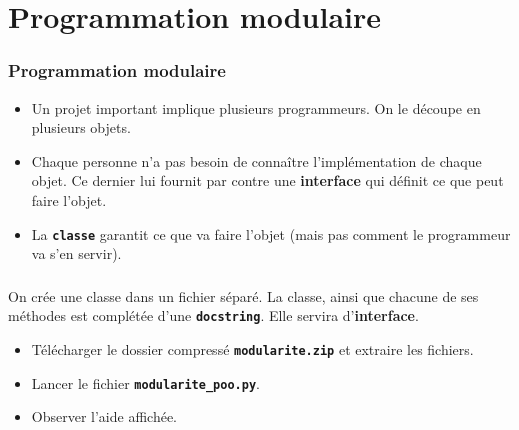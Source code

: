 \documentclass[svgnames,11pt]{beamer}
\begin{document}
\section{Programmation modulaire}
\begin{frame}
    \frametitle{Programmation modulaire}
\begin{itemize}
    \item <1-> Un projet important implique plusieurs programmeurs. On le découpe en plusieurs objets.
    \item <2-> Chaque personne n'a pas besoin de connaître l'implémentation de chaque objet. Ce dernier lui fournit par contre une \textbf{interface} qui définit ce que peut faire l'objet.
    \item <3-> La \texttt{\textbf{classe}} garantit ce que va faire l'objet (mais pas comment le programmeur va s'en servir).
\end{itemize}

\end{frame}
\begin{frame}
    \frametitle{}

    \begin{aretenir}[]
On crée une classe dans un fichier séparé. La classe, ainsi que chacune de ses méthodes est complétée d'une \textbf{\texttt{docstring}}. Elle servira d'\textbf{interface}.
    \end{aretenir}
\begin{activite}
\begin{itemize}
    \item Télécharger le dossier compressé \textbf{\texttt{modularite.zip}} et extraire les fichiers.
    \item Lancer le fichier \textbf{\texttt{modularite\_poo.py}}.
    \item Observer l'aide affichée.
\end{itemize}
\end{activite}
\end{frame}
\end{document}
